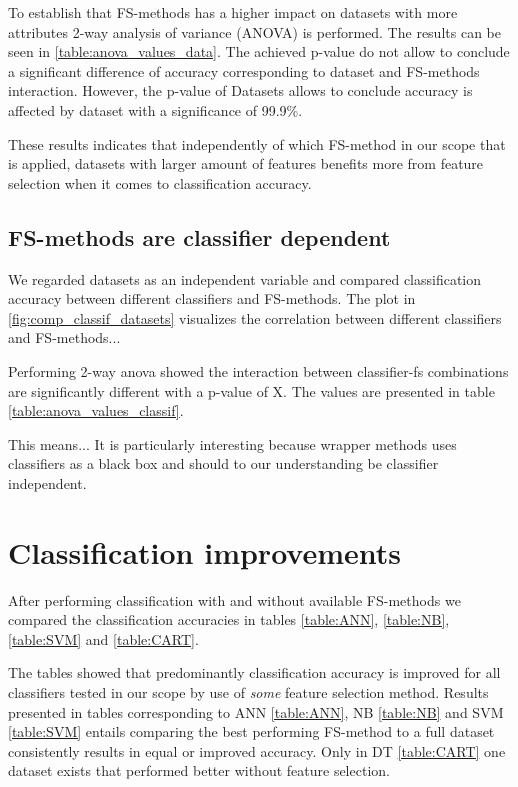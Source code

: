 To establish that FS-methods has a higher impact on datasets with more attributes 2-way analysis of variance (ANOVA) is performed. The results can be seen in \ref{table:anova_values_data}. The achieved p-value do not allow to conclude a significant difference of accuracy corresponding to dataset and FS-methods interaction. However, the p-value of Datasets allows to conclude accuracy is affected by dataset with a significance of 99.9\%.



These results indicates that independently of which FS-method in our scope that is applied, datasets with larger amount of features benefits more from feature selection when it comes to classification accuracy.

\subsection{FS-methods are classifier dependent}

We regarded datasets as an independent variable and compared classification accuracy between different classifiers and FS-methods. The plot in \ref{fig:comp_classif_datasets} visualizes the correlation between different classifiers and FS-methods...

Performing 2-way anova showed the interaction between classifier-fs combinations are significantly different with a p-value of X. The values are presented in table \ref{table:anova_values_classif}.

This means... It is particularly interesting because wrapper methods uses classifiers as a black box and should to our understanding be classifier independent.




\section{Classification improvements}

After performing classification with and without available FS-methods we compared the classification accuracies in tables \ref{table:ANN}, \ref{table:NB}, \ref{table:SVM} and \ref{table:CART}.

The tables showed that predominantly classification accuracy is improved for all classifiers tested in our scope by use of \textit{some} feature selection method. Results presented in tables corresponding to ANN \ref{table:ANN}, NB \ref{table:NB} and SVM \ref{table:SVM} entails comparing the best performing FS-method to a full dataset consistently results in equal or improved accuracy. Only in DT \ref{table:CART} one dataset exists that performed better without feature selection.


